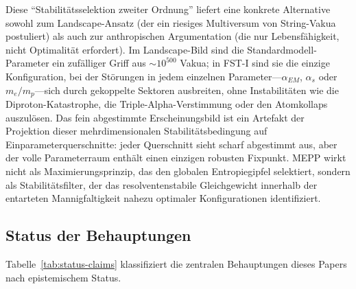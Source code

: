 \documentclass[12pt,a4paper]{article}
\theoremstyle{remark}
\begin{document}
Diese ``Stabilit\"atsselektion zweiter Ordnung'' liefert eine konkrete Alternative sowohl zum Landscape-Ansatz (der ein riesiges Multiversum von String-Vakua postuliert) als auch zur anthropischen Argumentation (die nur Lebensf\"ahigkeit, nicht Optimalit\"at erfordert). Im Landscape-Bild sind die Standardmodell-Parameter ein zuf\"alliger Griff aus $\sim 10^{500}$ Vakua; in FST-I sind sie die einzige Konfiguration, bei der St\"orungen in jedem einzelnen Parameter---$\alpha_{EM}$, $\alpha_s$ oder $m_e/m_p$---sich durch gekoppelte Sektoren ausbreiten, ohne Instabilit\"aten wie die Diproton-Katastrophe, die Triple-Alpha-Verstimmung oder den Atomkollaps auszul\"osen. Das fein abgestimmte Erscheinungsbild ist ein Artefakt der Projektion dieser mehrdimensionalen Stabilit\"atsbedingung auf Einparameterquerschnitte: jeder Querschnitt sieht scharf abgestimmt aus, aber der volle Parameterraum enth\"alt einen einzigen robusten Fixpunkt. MEPP wirkt nicht als Maximierungsprinzip, das den globalen Entropiegipfel selektiert, sondern als Stabilit\"atsfilter, der das resolventenstabile Gleichgewicht innerhalb der entarteten Mannigfaltigkeit nahezu optimaler Konfigurationen identifiziert.

\subsection{Status der Behauptungen}

Tabelle~\ref{tab:status-claims} klassifiziert die zentralen Behauptungen dieses Papers nach epistemischem Status.
\end{document}
